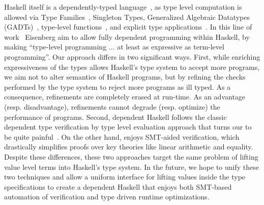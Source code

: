  
Haskell itself is a dependently-typed language~\cite{Eisenberg16},
as type level computation is allowed via 
Type Families~\cite{McBride02},
Singleton Types\cite{Weirich12}, 
Generalized Algebraic  Datatypes (GADTs)~\cite{JonesVWW06, SchrijversJSV09}, 
type-level functions~\cite{ChakravartyKJ05}, 
and explicit type applications~\cite{EisenbergWA16}. 
%
In this line of work~\citep{EisenbergS14}
Eisenberg \etal aim to allow fully dependent
programming within Haskell, by making
``type-level programming ... at least as
  expressive as term-level programming''.
%
Our approach differs in two significant ways.
%
First, while enriching expressiveness of the types
allows Haskell's type system to accept more programs, 
we aim not to alter semantics of Haskell programs, 
but by refining the checks performed by the type system 
to reject more programs as ill typed. 
%
As a consequence, refinements are completely erased at run-time.
%
As an advantage (resp. disadvantage), refinements
cannot degrade (resp. optimize)
the performance of programs.
%
Second, dependent Haskell follows the classic dependent type 
verification by type level evaluation approach
that turns our to be quite painful~\cite{LindleyM13}.
On the other hand, \toolname 
enjoys SMT-aided verification,
which drastically simplifies proofs over key theories
like linear arithmetic and equality.
%
Despite these differences, these two approaches target 
the same problem of lifting value level terms into Haskell's type system. 
%
In the future, we hope to unify these two techniques and 
allow a uniform interface for lifting values inside the type specifications
to create a dependent Haskell
that enjoys 
both SMT-based automation of verification and  
type driven runtime optimizations. 










